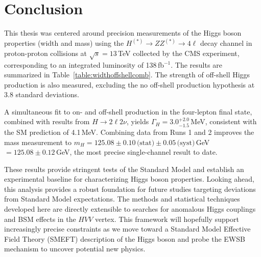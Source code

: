 \chapter{Conclusion} \label{chap:chap-5}

This thesis was centered around precision measurements of the Higgs boson properties (width and mass) using the $H^{(*)} \to ZZ^{(*)} \to 4\ell$ decay channel in proton-proton collisions at $\sqrt{s} = 13$\,TeV collected by the CMS experiment, corresponding to an integrated luminosity of 138\,fb$^{-1}$. The results are summarized in Table~\ref{table:widthoffshellcomb}. The strength of off-shell Higgs production is also measured, excluding the no off-shell production hypothesis at 3.8 standard deviations. 

A simultaneous fit to on- and off-shell production in the four-lepton final state, combined with results from $H \to 2\ell2\nu$, yields $\Gamma_H = 3.0^{+2.0}_{-1.5}$\,MeV, consistent with the SM prediction of 4.1\,MeV. Combining data from Runs 1 and 2 improves the mass measurement to $m_H = 125.08 \pm 0.10\,\text{(stat)} \pm 0.05\,\text{(syst)}\,$GeV$ = 125.08 \pm 0.12\,$GeV, the most precise single-channel result to date. 

These results provide stringent tests of the Standard Model and establish an experimental baseline for characterizing Higgs boson properties. Looking ahead, this analysis provides a robust foundation for future studies targeting deviations from Standard Model expectations. The methods and statistical techniques developed here are directly extensible to searches for anomalous Higgs couplings and BSM effects in the $HVV$ vertex. This framework will hopefully support increasingly precise constraints as we move toward a Standard Model Effective Field Theory (SMEFT) description of the Higgs boson and probe the EWSB mechanism to uncover potential new physics.





